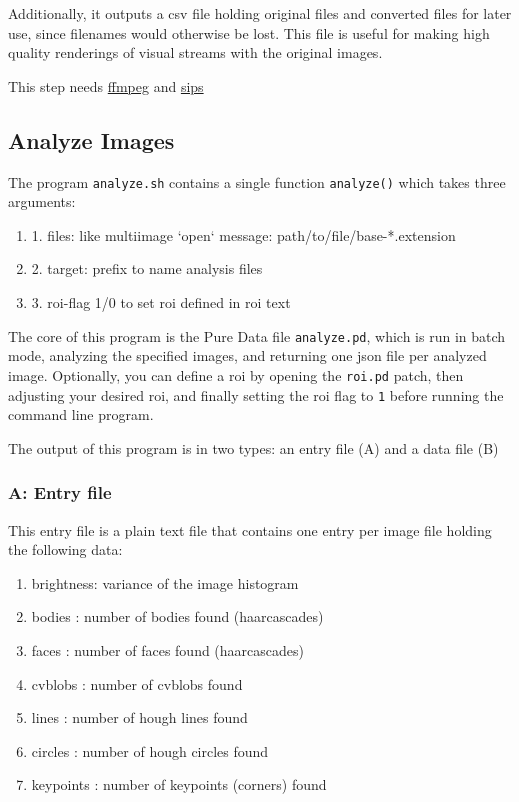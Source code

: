 Additionally, it outputs a \gls{csv} file holding original files and converted files for later use, since filenames would otherwise be lost. This file is useful for making high quality renderings of visual streams with the original images. 

This step needs \href{https://ffmpeg.org/ffmpeg.html}{ffmpeg} and \href{https://ss64.com/osx/sips.html}{sips}


\subsection{Analyze Images}

The program \texttt{analyze.sh} contains a single function \texttt{analyze()}  which takes three arguments:

\begin{enumerate}
\item 1. files: like multiimage `open` message: path/to/file/base-*.extension
\item 2. target: prefix to name analysis files
\item 3. roi-flag 1/0 to set roi defined in roi text
\end{enumerate}

The core of this program is the Pure Data file \texttt{analyze.pd}, which is run in batch mode, analyzing the specified images, and returning one \gls{json} file per analyzed image. Optionally, you can define a \gls{roi} by opening the \texttt{roi.pd} patch, then adjusting your desired \gls{roi}, and finally setting the \gls{roi} flag to \texttt{1} before running the command line program.

The output of this program is in two types: an entry file (A) and a data file (B)

\subsubsection{A: Entry file} 
This entry file is a plain text file that contains one entry per image file holding the following data:

\begin{enumerate}
\item brightness: variance of the image histogram
\item bodies : number of bodies found (haarcascades)
\item faces : number of faces found (haarcascades)
\item cvblobs : number of cvblobs found
\item lines : number of hough lines found
\item circles : number of hough circles found
\item keypoints : number of keypoints (corners) found
\end{enumerate}


